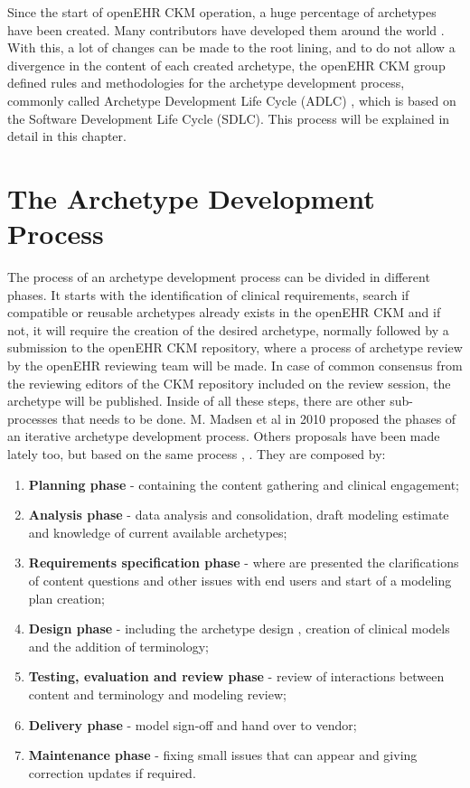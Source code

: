 \documentclass[mim_thesis.tex]{subfiles}
\begin{document}
Since the start of openEHR CKM operation, a huge percentage of archetypes have been created. Many contributors have developed them around the world \citep{openEHRCKM}. With this, a lot of changes can be made to the root lining, and to do not allow a divergence in the content of each created archetype, the openEHR CKM group defined rules and methodologies for the archetype development process, commonly called Archetype Development Life Cycle (ADLC) \citep{Madsen2010}, which is based on the Software Development Life Cycle (SDLC). This process will be explained in detail in this chapter.


\section{The Archetype Development Process}
The process of an archetype development process can be divided in different phases. It starts with the identification of clinical requirements, search if compatible or reusable archetypes already exists in the openEHR CKM and if not, it will require the creation of the desired archetype, normally followed by a submission to the openEHR CKM repository, where a process of archetype review by the openEHR reviewing team will be made. In case of common consensus from the reviewing editors of the CKM repository included on the review session, the archetype will be published. Inside of all these steps, there are other sub-processes that needs to be done. M. Madsen et al in 2010 proposed the phases of an iterative archetype development process. Others proposals have been made lately too, but based on the same process \citep{hammond2014standards}, \citep{Min2018ChinaEHR}. They are composed by:

\begin{enumerate}[noitemsep]
\item \textbf{Planning phase} - containing the content gathering and clinical engagement;
\item \textbf{Analysis phase} - data analysis and consolidation, draft modeling estimate and knowledge of current available archetypes;
\item \textbf{Requirements specification phase} - where are presented the clarifications of content questions and other issues with end users and start of a modeling plan creation;
\item \textbf{Design phase} - including the archetype design \citep{beale2007archetype}, creation of clinical models and the addition of terminology;
\item \textbf{Testing, evaluation and review phase} - review of interactions between content and terminology and modeling review;
\item \textbf{Delivery phase} - model sign-off and hand over to vendor;
\item \textbf{Maintenance phase} - fixing small issues that can appear and giving correction updates if required.
\end{enumerate}
\end{document}
